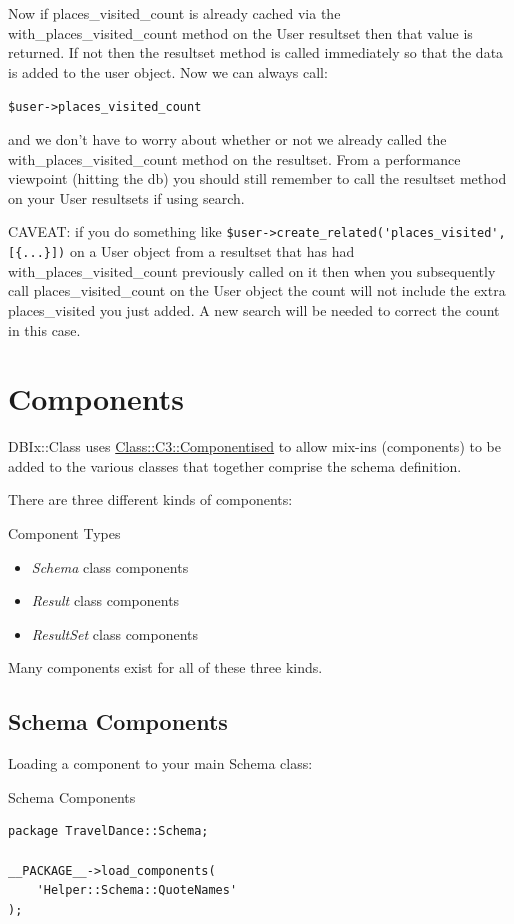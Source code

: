 Now if places\_visited\_count is already cached via the with\_places\_visited\_count
method on the User resultset then that value is returned. If not then the
resultset method is called immediately so that the data is added to the user
object. Now we can always call:

\verb|$user->places_visited_count|

and we don't have to worry about whether or not we already called the
with\_places\_visited\_count method on the resultset. From a performance viewpoint
(hitting the db) you should still remember to call the resultset method on
your User resultsets if using search. 

CAVEAT: if you do something like 
\verb|$user->create_related('places_visited', [{...}])|
on a User object from a resultset that has had with\_places\_visited\_count
previously called on it then when you subsequently call places\_visited\_count on
the User object the count will not include the extra places\_visited you just
added. A new search will be needed to correct the count in this case.

\section{Components}
DBIx::Class uses \href{https://metacpan.org/pod/Class::C3::Componentised}
{Class::C3::Componentised} to allow mix-ins (components) to be added to the 
various classes that together comprise the schema definition. 

There are three different kinds of components:

\begin{frame}{Component Types}
\begin{itemize}
\item \emph{Schema} class components
\item \emph{Result} class components
\item \emph{ResultSet} class components
\end{itemize}
\end{frame}
 
Many components exist for all of these three kinds.

\subsection{Schema Components}

Loading a component to your main Schema class:

\begin{frame}[fragile]{Schema Components}
\begin{lstlisting}
package TravelDance::Schema;
 
__PACKAGE__->load_components(
    'Helper::Schema::QuoteNames'
);
\end{lstlisting}
\end{frame}

